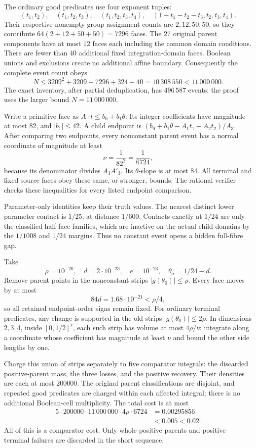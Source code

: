 The ordinary good predicates use four exponent tuples:
\[
 (t_1,t_2),\quad(t_1,t_2,t_3),\quad(t_1,t_2,t_3,t_4),\quad
 (1-t_1-t_2-t_3,t_2,t_3,t_4).
\]
Their respective nonempty group assignment counts are $2,12,50,50$,
so they contribute $64(2+12+50+50)=7296$ faces.
The $27$ original parent components have at most $12$ faces each
including the common domain conditions. There are fewer than $40$
additional fixed integration-domain faces. Boolean unions and
exclusions create no additional affine boundary.
Consequently the complete event count obeys
\[
 N\le3209^2+3209+7296+324+40
      =10\,308\,550<11\,000\,000.
\]
The exact inventory, after partial deduplication, has $496\,587$
events; the proof uses the larger bound $N=11\,000\,000$.

Write a primitive face as $A\cdot t\le b_0+b_1\theta$.
Its integer coefficients have magnitude at most $82$, and
$|b_1|\le42$. A child endpoint is
$(b_0+b_1\theta-A_1t_1-A_2t_2)/A_3$.
After comparing two endpoints, every nonconstant parent event has
a normal coordinate of magnitude at least
\[
                  \nu=\frac1{82^2}=\frac1{6724},
\]
because its denominator divides $A_3A'_3$.
Its $\theta$-slope is at most $84$.
All terminal and fixed source faces obey these same, or stronger,
bounds. The rational verifier checks these inequalities for every
listed endpoint comparison.

Parameter-only identities keep their truth values. The nearest
distinct lower parameter contact is $1/25$, at distance $1/600$.
Contacts exactly at $1/24$ are only the classified half-face families,
which are inactive on the actual child domains by the $1/1008$ and
$1/24$ margins. Thus no constant event opens a hidden full-fibre gap.

Take
\[
 \rho=10^{-20},\quad d=2\cdot10^{-23},\quad e=10^{-23},\quad
 \theta_a=1/24-d.
\]
Remove parent points in the nonconstant strips $|g(\theta_0)|\le\rho$.
Every face moves by at most
\[
 84d=1.68\cdot10^{-21}<\rho/4,
\]
so all retained endpoint-order signs remain fixed.
For ordinary terminal predicates, any change is supported in the
old strips $|g(\theta_0)|\le2\rho$.
In dimensions $2,3,4$, inside $[0,1/2]^r$, each such strip has volume
at most $4\rho/\nu$: integrate along a coordinate whose coefficient
has magnitude at least $\nu$ and bound the other side lengths by one.

Charge this union of strips separately to five comparator integrals:
the discarded positive-parent mass, the three losses, and the positive
recovery. Their densities are each at most $200000$.
The original parent classifications are disjoint, and repeated good
predicates are charged within each affected integral; there is no
additional Boolean-cell multiplicity. The total cost is at most
\begin{align*}
 5\cdot200000\cdot11\,000\,000\cdot4\rho\cdot6724
       &=0.00295856\\
       &<0.005<0.02.
\end{align*}
All of this is a comparator cost. Only whole positive parents and
positive terminal failures are discarded in the short sequence.

